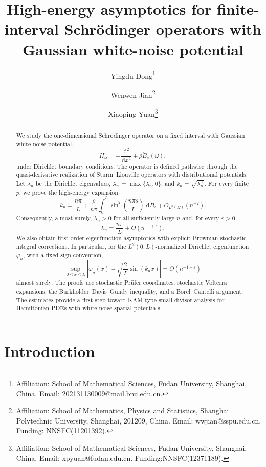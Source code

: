 \documentclass[11pt]{article}
\title{High-energy asymptotics for finite-interval Schr\"odinger operators with
Gaussian white-noise potential}
\author{
Yingdu Dong\thanks{Affiliation: School of Mathematical Sciences, Fudan University, Shanghai, China. Email: 202131130009@mail.bnu.edu.cn.}
\and
Wenwen Jian\thanks{Affiliation: School of Mathematics, Physics and Statistics, Shanghai Polytechnic University, Shanghai, 201209, China. Email: wwjian@sspu.edu.cn. Funding: NNSFC(11201392).}
\and
Xiaoping Yuan\thanks{Affiliation: School of Mathematical Sciences, Fudan University, Shanghai, China. Email: xpyuan@fudan.edu.cn. Funding:NNSFC(12371189).}
}
\date{}
\newcommand{\dd}{\,\mathrm d}
\begin{document}
\maketitle

\begin{abstract}
We study the one-dimensional Schr\"odinger operator on a fixed interval with
Gaussian white-noise potential,
\[
    H_\omega=-\frac{\dd^2}{\dd x^2}+\rho\dot B_x(\omega),
\]
under Dirichlet boundary conditions. The operator is defined pathwise through
the quasi-derivative realization of Sturm--Liouville operators with
distributional potentials. Let $\lambda_n$ be the Dirichlet eigenvalues,
$\lambda_n^+=\max\{\lambda_n,0\}$, and $k_n=\sqrt{\lambda_n^+}$. For every
finite $p$, we prove the high-energy expansion
\[
    k_n=\frac{n\pi}{L}
    +\frac{\rho}{n\pi}\int_0^L
    \sin^2\left(\frac{n\pi s}{L}\right)\,\dd B_s
    +O_{L^p(\Omega)}(n^{-2}).
\]
Consequently, almost surely, $\lambda_n>0$ for all sufficiently large $n$ and,
for every $\varepsilon>0$,
\[
    k_n=\frac{n\pi}{L}+O(n^{-1+\varepsilon}).
\]
We also obtain first-order eigenfunction asymptotics with explicit Brownian
stochastic-integral corrections. In particular, for the $L^2(0,L)$-normalized
Dirichlet eigenfunction $\varphi_n$, with a fixed sign convention,
\[
    \sup_{0\le x\le L}
    \left|\varphi_n(x)-\sqrt{\frac{2}{L}}\sin(k_n x)\right|
    =O(n^{-1+\varepsilon})
\]
almost surely. The proofs use stochastic Pr\"ufer coordinates, stochastic
Volterra expansions, the Burkholder--Davis--Gundy inequality, and a
Borel--Cantelli argument. The estimates provide a first step toward KAM-type small-divisor analysis for
Hamiltonian PDEs with white-noise spatial potentials.
\end{abstract}



\section{Introduction}
\end{document}
